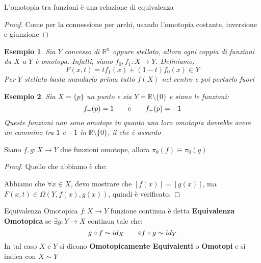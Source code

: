 \documentclass[11pt,a4paper,twoside]{article}
\newtheorem{es}{Esempio}
\theoremstyle{definition}
\begin{document}
\begin{prop}{}{}
	L'omotopia tra funzioni è una relazione di equivalenza
\end{prop}
\begin{proof}
	Come per la connessione per archi, usando l'omotopia costante, inversione e giunzione
\end{proof}

\begin{es}
	Sia $Y$ convesso di $\mathbb R^n$ oppure stellato, allora ogni coppia di funzioni da $X$ a $Y$ è omotopa. Infatti, siano $f_0, f_1:X \to Y$. Definiamo:
	\[ F(x,t) = tf_1(x) + (1-t)f_0(x) \in Y \]
	Per $Y$ stellato basta mandarlo prima tutto $f(X)$ nel centro e poi portarlo fuori
\end{es}

\begin{es}
	Sia $X = \{p\}$ un punto e sia $Y = \mathbb R\setminus\{0\}$ e siano le funzioni:
	\[ f_+(p)=1\qquad \text e\qquad f_-(p)=-1 \]
	Queste funzioni non sono omotope in quanto una loro omotopia dovrebbe avere un cammino tra $1$ e $-1$ in $\mathbb R\setminus\{0\}$, il che è assurdo
\end{es}

\begin{lemma}{}{}
	Siano $f,g:X \to Y$ due funzioni omotope, allora $\pi_0(f) \equiv \pi_0(g)$
\end{lemma}
\begin{proof}
	Quello che abbiamo è che:
	\begin{center}
	\end{center}
	Abbiamo che $\forall x \in X$, devo mostrare che $[f(x)] = [g(x)]$, ma $F(x, t) \in \Omega(Y, f(x), g(x))$, quindi è verificato.
\end{proof}

\begin{defn}{Equivalenza Omotopica}{}
	$f:X \to Y$ funzione continua è detta \textbf{Equivalenza Omotopica} se $\exists g:Y \to X$ continua tale che:
	\[ g \circ f \sim id_X\qquad \text e f \circ g \sim id_Y \]
	In tal caso $X$ e $Y$ si dicono \textbf{Omotopicamente Equivalenti} o \textbf{Omotopi} e si indica con $X \sim Y$
\end{defn}
\end{document}
